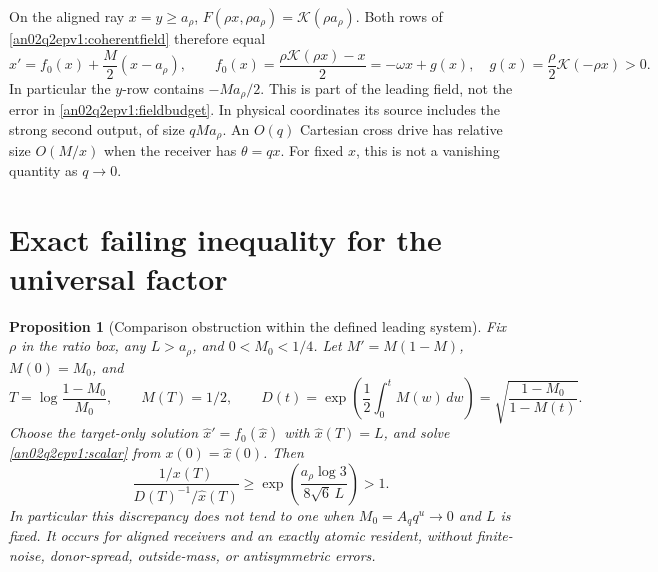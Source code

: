 \documentclass[11pt]{article}
\newtheorem{proposition}[theorem]{Proposition}
\theoremstyle{remark}\newtheorem{remark}[theorem]{Remark}
\newcommand{\dd}{\,d}
\begin{document}
On the aligned ray $x=y\ge a_\rho$,
$F(\rho x,\rho a_\rho)=\mathcal K(\rho a_\rho)$.
Both rows of \eqref{an02q2epv1:coherentfield} therefore equal
\begin{equation}
 x'=f_0(x)+\frac M2(x-a_\rho),\qquad
 f_0(x)=\frac{\rho\mathcal K(\rho x)-x}{2}
       =-\omega x+g(x),\quad
 g(x)=\frac{\rho}{2}\mathcal K(-\rho x)>0 .
 \label{an02q2epv1:scalar}
\end{equation}
In particular the $y$-row contains $-Ma_\rho/2$.
This is part of the leading field, not the error in
\eqref{an02q2epv1:fieldbudget}. In physical coordinates its source
includes the strong second output, of size $qMa_\rho$.
An $O(q)$ Cartesian cross drive has relative size $O(M/x)$
when the receiver has $\theta=qx$.
For fixed $x$, this is not a vanishing quantity as $q\to0$.

\section{Exact failing inequality for the universal factor}
\begin{proposition}[Comparison obstruction within the defined leading system]
\label{an02q2epv1:obstruction}
Fix $\rho$ in the ratio box, any $L>a_\rho$, and $0<M_0<1/4$.
Let $M'=M(1-M)$, $M(0)=M_0$, and
\[
 T=\log\frac{1-M_0}{M_0},\qquad M(T)=1/2,\qquad
 D(t)=\exp\!\left(\frac12\int_0^t M(w)\dd w\right)
     =\sqrt{\frac{1-M_0}{1-M(t)}}.
\]
Choose the target-only solution $\widehat x'=f_0(\widehat x)$
with $\widehat x(T)=L$, and solve \eqref{an02q2epv1:scalar}
from $x(0)=\widehat x(0)$.
Then
\begin{equation}
 \frac{\,1/x(T)\,}{D(T)^{-1}/\widehat x(T)}
 \ge \exp\!\left(\frac{a_\rho\log3}{8\sqrt6\,L}\right)>1 .
 \label{an02q2epv1:failure}
\end{equation}
In particular this discrepancy does not tend to one when
$M_0=A_q q^u\to0$ and $L$ is fixed. It occurs for aligned receivers
and an exactly atomic resident, without finite-noise, donor-spread,
outside-mass, or antisymmetric errors.
\end{proposition}
\end{document}

